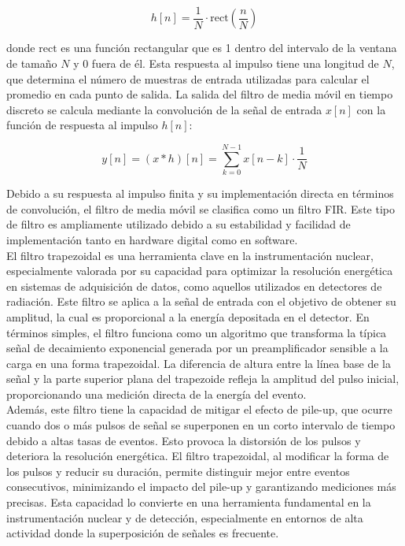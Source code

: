 \documentclass{report}
\begin{document}
\begin{equation}
    h[n] = \frac{1}{N} \cdot \text{rect}\left(\frac{n}{N}\right)
\end{equation}

\noindent donde \( \text{rect} \) es una función rectangular que es 1 dentro del intervalo de la ventana de tamaño \( N \) y 0 fuera de él. Esta respuesta al impulso tiene una longitud de \( N \), que determina el número de muestras de entrada utilizadas para calcular el promedio en cada punto de salida. La salida del filtro de media móvil en tiempo discreto se calcula mediante la convolución de la señal de entrada \( x[n] \) con la función de respuesta al impulso \( h[n] \):

\begin{equation}
    y[n] = (x * h)[n] = \sum_{k=0}^{N-1} x[n-k] \cdot \frac{1}{N}
\end{equation}

\noindent Debido a su respuesta al impulso finita y su implementación directa en términos de convolución, el filtro de media móvil se clasifica como un filtro FIR. Este tipo de filtro es ampliamente utilizado debido a su estabilidad y facilidad de implementación tanto en hardware digital como en software. \\

\noindent El filtro trapezoidal es una herramienta clave en la instrumentación nuclear, especialmente valorada por su capacidad para optimizar la resolución energética en sistemas de adquisición de datos, como aquellos utilizados en detectores de radiación. Este filtro se aplica a la señal de entrada con el objetivo de obtener su amplitud, la cual es proporcional a la energía depositada en el detector. En términos simples, el filtro funciona como un algoritmo que transforma la típica señal de decaimiento exponencial generada por un preamplificador sensible a la carga en una forma trapezoidal. La diferencia de altura entre la línea base de la señal y la parte superior plana del trapezoide refleja la amplitud del pulso inicial, proporcionando una medición directa de la energía del evento. \cite{knoll7}\\

\noindent Además, este filtro tiene la capacidad de mitigar el efecto de pile-up, que ocurre cuando dos o más pulsos de señal se superponen en un corto intervalo de tiempo debido a altas tasas de eventos. Esto provoca la distorsión de los pulsos y deteriora la resolución energética. El filtro trapezoidal, al modificar la forma de los pulsos y reducir su duración, permite distinguir mejor entre eventos consecutivos, minimizando el impacto del pile-up y garantizando mediciones más precisas. Esta capacidad lo convierte en una herramienta fundamental en la instrumentación nuclear y de detección, especialmente en entornos de alta actividad donde la superposición de señales es frecuente.\\
\end{document}
